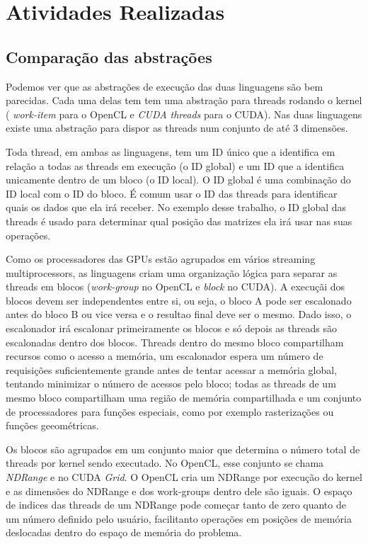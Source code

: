 \section{Atividades Realizadas}
\subsection{Comparação das abstrações}
Podemos ver que as abstrações de execução das duas linguagens são bem parecidas. Cada uma delas tem tem uma abstração
para threads rodando o kernel ( \textit{work-item} para o OpenCL e \textit{CUDA threads} para o CUDA). Nas duas linguagens
existe uma abstração para dispor as threads num conjunto de até 3 dimensões. 

Toda thread, em ambas as linguagens, tem um ID único que a identifica em relação a todas as threads em execução (o ID global) 
e um ID que a identifica unicamente dentro de um bloco (o ID local). O ID global é uma combinação do ID local com o ID do bloco. 
É comum usar o ID das threads para identificar quais os dados que ela irá receber. No exemplo desse trabalho, o ID 
global das threads é usado para determinar qual posição das matrizes ela irá usar nas suas operações. 

Como os processadores das GPUs estão agrupados em vários streaming multiprocessors, as linguagens criam uma organização lógica para
separar as threads em blocos (\textit{work-group} no OpenCL e \textit{block} no CUDA). A execuçãi dos blocos devem ser independentes entre
si, ou seja, o bloco A pode ser escalonado antes do bloco B ou vice versa e o resultao final deve ser o mesmo. Dado isso, o escalonador
irá escalonar primeiramente os blocos e só depois as threads são escalonadas dentro dos blocos. Threads dentro
do mesmo bloco compartilham recursos como o acesso a memória, um escalonador espera um número de requisições suficientemente grande 
antes de tentar acessar a memória global, tentando minimizar o número de acessos pelo bloco; todas as threads de um mesmo bloco
compartilham uma região de memória compartilhada e um conjunto de processadores para funções especiais, como por exemplo
rasterizações ou funções geeométricas. 

Os blocos são agrupados em um conjunto maior que determina o número total de threads por kernel sendo executado. 
No OpenCL, esse conjunto se chama \textit{NDRange} e no CUDA \textit{Grid}. O OpenCL cria um NDRange por execução do kernel
e as dimensões do NDRange e dos work-groups dentro dele são iguais. O espaço de indices das threads de um NDRange pode começar 
tanto de zero quanto de um número definido pelo usuário, facilitanto operações em posições de memória deslocadas dentro 
do espaço de memória do problema.
	
